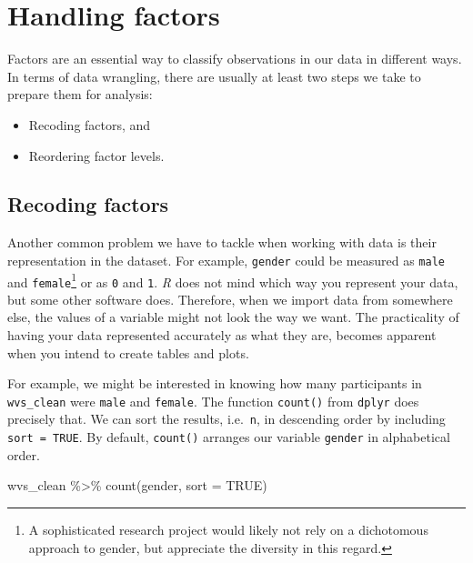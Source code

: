 \documentclass[
  letterpaper,
]{krantz}
\makeatletter
\newenvironment{Shaded}{\begin{snugshade}}{\end{snugshade}}
\newcommand{\AttributeTok}[1]{\textcolor[rgb]{0.40,0.45,0.13}{#1}}
\newcommand{\ConstantTok}[1]{\textcolor[rgb]{0.56,0.35,0.01}{#1}}
\newcommand{\FunctionTok}[1]{\textcolor[rgb]{0.28,0.35,0.67}{#1}}
\newcommand{\NormalTok}[1]{\textcolor[rgb]{0.00,0.23,0.31}{#1}}
\newcommand{\SpecialCharTok}[1]{\textcolor[rgb]{0.37,0.37,0.37}{#1}}
\newenvironment{kframe}{%
\medskip{}
\setlength{\fboxsep}{.8em}
 \def\at@end@of@kframe{}%
 \ifinner\ifhmode%
  \def\at@end@of@kframe{\end{minipage}}%
  \begin{minipage}{\columnwidth}%
 \fi\fi%
 \def\FrameCommand##1{\hskip\@totalleftmargin \hskip-\fboxsep
 \colorbox{shadecolor}{##1}\hskip-\fboxsep
     \hskip-\linewidth \hskip-\@totalleftmargin \hskip\columnwidth}%
 \MakeFramed {\advance\hsize-\width
   \@totalleftmargin\z@ \linewidth\hsize
   \@setminipage}}%
 {\par\unskip\endMakeFramed%
 \at@end@of@kframe}
\renewenvironment{Shaded}{\begin{kframe}}{\end{kframe}}
\makeatother
\begin{document}
\section{Handling factors}\label{handling-factors}

Factors are an essential way to classify observations in our data in
different ways. In terms of data wrangling, there are usually at least
two steps we take to prepare them for analysis:

\begin{itemize}
\item
  Recoding factors, and
\item
  Reordering factor levels.
\end{itemize}

\subsection{Recoding factors}\label{recoding-factors}

Another common problem we have to tackle when working with data is their
representation in the dataset. For example, \texttt{gender} could be
measured as \texttt{male} and \texttt{female}\footnote{A sophisticated
  research project would likely not rely on a dichotomous approach to
  gender, but appreciate the diversity in this regard.} or as \texttt{0}
and \texttt{1}. \emph{R} does not mind which way you represent your
data, but some other software does. Therefore, when we import data from
somewhere else, the values of a variable might not look the way we want.
The practicality of having your data represented accurately as what they
are, becomes apparent when you intend to create tables and plots.

For example, we might be interested in knowing how many participants in
\texttt{wvs\_clean} were \texttt{male} and \texttt{female}. The function
\texttt{count()} from \texttt{dplyr} does precisely that. We can sort
the results, i.e.~\texttt{n}, in descending order by including
\texttt{sort\ =\ TRUE}. By default, \texttt{count()} arranges our
variable \texttt{gender} in alphabetical order.

\begin{Shaded}
\begin{Highlighting}[]
\NormalTok{wvs\_clean }\SpecialCharTok{\%\textgreater{}\%} \FunctionTok{count}\NormalTok{(gender, }\AttributeTok{sort =} \ConstantTok{TRUE}\NormalTok{)}
\end{Highlighting}
\end{Shaded}
\end{document}
